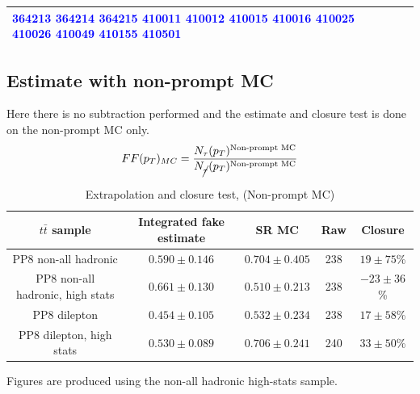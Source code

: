\documentclass[11pt]{article}
\begin{document}
\begin{table}[htp]
\begin{center}
\begin{tabular}{|l|p{10cm}|}
\textcolor{blue}{364213} \textcolor{blue}{364214} \textcolor{blue}{364215} \textcolor{blue}{410011} \textcolor{blue}{410012} \textcolor{blue}{410015} \textcolor{blue}{410016} \textcolor{blue}{410025} \textcolor{blue}{410026} \textcolor{blue}{410049} \textcolor{blue}{410155} \textcolor{blue}{410501}\\
			\hline
			\end{tabular}
		\end{center}
		\label{mc_samples}
	\end{table}





	\clearpage
	\subsection{Estimate with non-prompt MC} 
	Here there is no subtraction performed and the estimate and closure test is done on the non-prompt MC only. 
	\begin{equation}
		FF(p_T)_{MC} = \frac{N_\tau (p_T)^{\text{Non-prompt MC}}}{N_{\cancel{\tau}} (p_T)^{\text{Non-prompt MC}}}
	\end{equation}

	
	\begin{table}[htp]
	\caption{Extrapolation and closure test, (Non-prompt MC)}
	\begin{center}
	\begin{tabular}{|c|c|c|c|c|}
	\hline
	$t\bar{t}$ sample 	& Integrated fake estimate	& SR MC		& Raw		& 	 Closure \\
	\hline
	PP8 non-all hadronic			& 	$0.590\pm0.146$ 		& $0.704\pm0.405$ 		& 238	&  $19\pm75$\% \\
	PP8 non-all hadronic, high stats	& 	$0.661\pm0.130$ 		& $0.510\pm0.213$ 		& 238	&  $-23\pm36$\% \\
	PP8 dilepton 					& 	$0.454\pm0.105$ 		& $0.532\pm0.234$ 		& 238	&  $17\pm58$\% \\
	PP8 dilepton, high stats			& 	$0.530\pm0.089$ 		& $0.706\pm0.241$ 		& 240	&  $33\pm50$\% \\
	\hline
	\end{tabular}
	\end{center}
	\label{default}
	\end{table}%
		
	Figures are produced using the non-all hadronic high-stats sample. 
	
\end{document}
